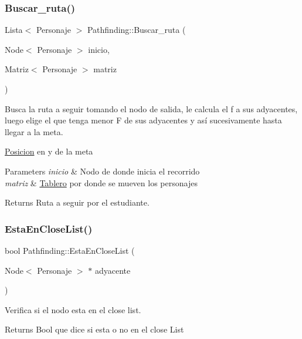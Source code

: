 \subsubsection{\texorpdfstring{Buscar\+\_\+ruta()}{Buscar\_ruta()}}
{\footnotesize\ttfamily Lista$<$ Personaje $>$ Pathfinding\+::\+Buscar\+\_\+ruta (\begin{DoxyParamCaption}\item[{Node$<$ Personaje $>$}]{inicio,  }\item[{Matriz$<$ Personaje $>$}]{matriz }\end{DoxyParamCaption})}



Busca la ruta a seguir tomando el nodo de salida, le calcula el f a sus adyacentes, luego elige el que tenga menor F de sus adyacentes y así sucesivamente hasta llegar a la meta. 

\hyperlink{classPosicion}{Posicion} en y de la meta 
\begin{DoxyParams}{Parameters}
{\em inicio} & Nodo de donde inicia el recorrido \\
\hline
{\em matriz} & \hyperlink{classTablero}{Tablero} por donde se mueven los personajes \\
\hline
\end{DoxyParams}
\begin{DoxyReturn}{Returns}
Ruta a seguir por el estudiante. 
\end{DoxyReturn}
\mbox{\label{classPathfinding_a22be584e0676401e57bb745f58f84612}} 
\subsubsection{\texorpdfstring{Esta\+En\+Close\+List()}{EstaEnCloseList()}}
{\footnotesize\ttfamily bool Pathfinding\+::\+Esta\+En\+Close\+List (\begin{DoxyParamCaption}\item[{Node$<$ Personaje $>$ $\ast$}]{adyacente }\end{DoxyParamCaption})}



Verifica si el nodo esta en el close list. 

\begin{DoxyReturn}{Returns}
Bool que dice si esta o no en el close List 
\end{DoxyReturn}
\mbox{\label{classPathfinding_a7224a794d8fec1a475d6cf2e6a190dd3}} 
